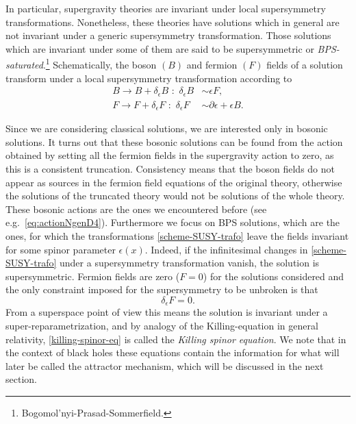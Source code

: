 \documentclass[12pt,twoside]{book}
\begin{document}
In particular, supergravity theories are invariant under local supersymmetry transformations. Nonetheless, these theories have solutions which in general are not invariant under a generic supersymmetry transformation. Those solutions which are invariant under some of them are said to be supersymmetric or \emph{BPS-saturated}.\footnote{
Bogomol'nyi-Prasad-Sommerfield.
} Schematically, the boson $(B)$ and fermion $(F)$ fields of a solution transform under a local supersymmetry transformation according to
\begin{equation}\label{scheme-SUSY-trafo}
\begin{split}
B \rightarrow B + \delta_{\epsilon}B \,\, : \,\,
\delta_{\epsilon} B &\sim \epsilon F, \\
F \rightarrow F + \delta_{\epsilon}F \,\, : \,\,
\delta_{\epsilon} F &\sim \partial\epsilon + \epsilon B.
\end{split}
\end{equation}

Since we are considering classical solutions, we are interested only in bosonic solutions. It turns out that these bosonic solutions can be found from the action obtained by setting all the fermion fields in the supergravity action to zero, as this is a consistent truncation. Consistency means that the boson fields do not appear as sources in the fermion field equations of the original theory, otherwise the solutions of the truncated theory would not be solutions of the whole theory. These bosonic actions are the ones we encountered before (see e.g.\ \eqref{eq:actionNgenD4}). Furthermore we focus on BPS solutions, which are the ones, for which the transformations \eqref{scheme-SUSY-trafo} leave the fields invariant for some spinor parameter $\epsilon(x)$. Indeed, if the infinitesimal changes in \eqref{scheme-SUSY-trafo} under a supersymmetry transformation vanish, the solution is supersymmetric.   Fermion fields are zero ($F = 0$) for the solutions considered and the only constraint imposed for the supersymmetry to be unbroken is that
\begin{equation}\label{killing-spinor-eq}
\delta_{\epsilon}F = 0.
\end{equation}
From a superspace point of view this means the solution is invariant under a super-reparametrization, and by analogy of the Killing-equation in general relativity, \eqref{killing-spinor-eq} is called the \emph{Killing spinor equation}. We note that in the context of black holes these equations contain the information for what will later be called the attractor mechanism, which will be discussed in the next section.\newline
\end{document}
